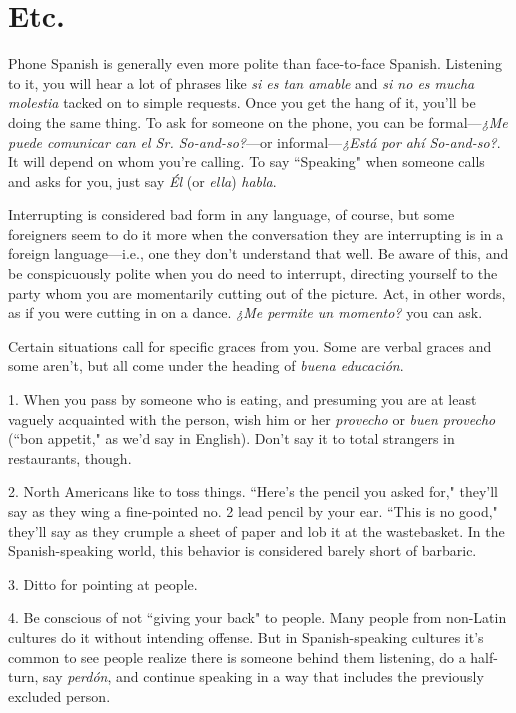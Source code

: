 \section{Etc.}

Phone Spanish is generally even more polite than face-to-face
Spanish. Listening to it, you will hear a lot of phrases like \emph{si es tan
amable} and \emph{si no es mucha molestia} tacked on to simple requests.
Once you get the hang of it, you'll be doing the same thing. To ask for
someone on the phone, you can be formal---\emph{¿Me puede comunicar can
el Sr. So-and-so?}---or informal---\emph{¿Está por ahí So-and-so?}. It will depend on whom you're calling. To say ``Speaking" when someone calls
and asks for you, just say \emph{Él} (or \emph{ella}) \emph{habla}.

Interrupting is considered bad form in any language, of course,
but some foreigners seem to do it more when the conversation they are
interrupting is in a foreign language---i.e., one they don't understand
that well. Be aware of this, and be conspicuously polite when you do
need to interrupt, directing yourself to the party whom you are momentarily cutting out of the picture. Act, in other words, as if you were
cutting in on a dance. \emph{¿Me permite un momento?} you can ask.

Certain situations call for specific graces from you. Some are
verbal graces and some aren't, but all come under the heading of \emph{buena educación}.

\bsk

1. When you pass by someone who is eating, and presuming
you are at least vaguely acquainted with the person, wish him or her
\emph{provecho} or \emph{buen provecho} (``bon appetit," as we'd say in English).
Don't say it to total strangers in restaurants, though.

2. North Americans like to toss things. ``Here's the pencil you
asked for," they'll say as they wing a fine-pointed no. 2 lead pencil by
your ear. ``This is no good," they'll say as they crumple a sheet of paper
and lob it at the wastebasket. In the Spanish-speaking world, this behavior is considered barely short of barbaric.

3. Ditto for pointing at people.

4. Be conscious of not ``giving your back" to people. Many
people from non-Latin cultures do it without intending offense. But in
Spanish-speaking cultures it's common to see people realize there is
someone behind them listening, do a half-turn, say \emph{perdón}, and continue speaking in a way that includes the previously excluded person.

